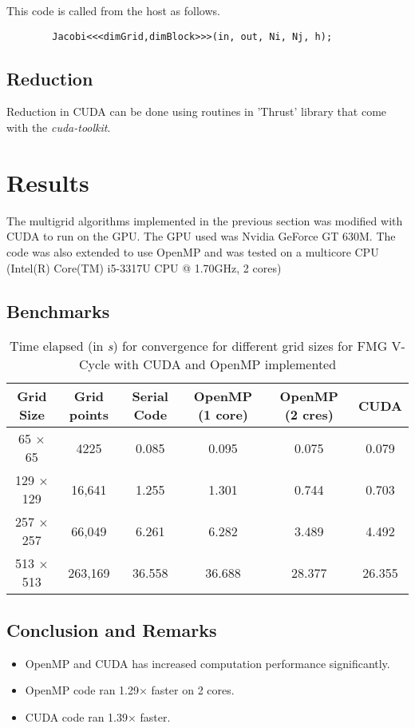 \documentclass[a4paper]{report}
\begin{document}
	This code is called from the host as follows.
	\begin{lstlisting}
		Jacobi<<<dimGrid,dimBlock>>>(in, out, Ni, Nj, h);
	\end{lstlisting}
	
	\subsection{Reduction}
	Reduction in CUDA can be done using routines in 'Thrust' library that come with the \textit{cuda-toolkit}.
	
	\section{Results}
	The multigrid algorithms implemented in the previous section was modified with CUDA to run on the GPU. The GPU used was Nvidia GeForce GT 630M. The code was also extended to use OpenMP and was tested on a multicore CPU (Intel(R) Core(TM) i5-3317U CPU @ 1.70GHz, 2 cores)
	
	\subsection{Benchmarks}
	
	\begin{table}
	\caption {Time elapsed (in \emph{s}) for convergence for different grid sizes for FMG V-Cycle with CUDA and OpenMP implemented} \label{omp_cuda_table} 
	\begin{center}
	\begin{tabular}{c c c c c c}
	\hline 
	Grid Size & Grid points & Serial Code & OpenMP (1 core) & OpenMP (2 cres) & CUDA \\ 
	\hline 
	65 $\times$ 65 & 4225 & 0.085 & 0.095 & 0.075 & 0.079 \\ 
	129 $\times$ 129 & 16,641 & 1.255 & 1.301 & 0.744 & 0.703 \\ 
	257 $\times$ 257 & 66,049 & 6.261 & 6.282 & 3.489 & 4.492 \\ 
	513 $\times$ 513 & 263,169 & 36.558 & 36.688 & 28.377 & 26.355 \\
	\hline 
	\end{tabular} 
	\end{center}
	\end{table}
	
	\subsection{Conclusion and Remarks}
	\begin{itemize}
	\item OpenMP and CUDA has increased computation performance significantly.
	\item OpenMP code ran 1.29$\times$ faster on 2 cores.
	\item CUDA code ran 1.39$\times$ faster.
	\end{itemize}
	
\end{document}
